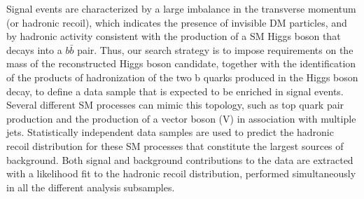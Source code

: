 


Signal events are characterized by a large imbalance in the transverse
momentum (or hadronic recoil), which indicates the presence of invisible
DM particles, and by hadronic activity consistent with the production
of a SM Higgs boson that decays into a $b\bar{b}$ pair. Thus, our search
strategy is to impose requirements on the mass of the reconstructed
Higgs boson candidate, together with the identification of the
products of hadronization of the two b quarks produced in the Higgs
boson decay, to define a data sample that is expected to be enriched
in signal events. Several different SM processes can mimic this topology, such as top quark pair production and the production of a vector boson (V) in association with multiple jets. Statistically independent data samples are used to predict the hadronic recoil distribution for these SM processes that constitute the largest sources of background.
Both signal and background contributions to the data are extracted with a likelihood fit to the hadronic recoil distribution, performed simultaneously in all the different analysis subsamples.
